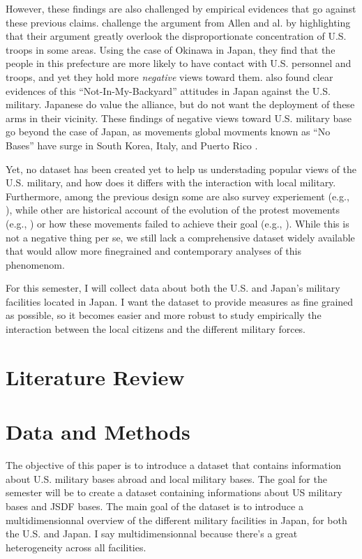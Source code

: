 \documentclass[12pt]{article}
\begin{document}
However, these findings are also challenged by empirical evidences
that go against these previous claims.  \textcite{hikotani_etal23}
challenge the argument from Allen and al. by highlighting that their
argument greatly overlook the disproportionate concentration of
U.S. troops in some areas.  Using the case of Okinawa in Japan,
they find that the people in this prefecture are more likely to
have contact with U.S.  personnel and troops, and yet they hold
more \textit{negative} views toward them. \textcite{horiuchi_tago23}
also found clear evidences of this ``Not-In-My-Backyard'' attitudes
in Japan against the U.S. military. Japanese do value the alliance,
but do not want the deployment of these arms in their vicinity.
These findings of negative views toward U.S. military base go beyond
the case of Japan, as movements global movments known as ``No Bases''
have surge in South Korea, Italy, and Puerto Rico \parencite{vine19}.

Yet, no dataset has been created yet to help us understading popular
views of the U.S. military, and how does it differs with the
interaction with local military. Furthermore, among the previous
design some are also survey experiement (e.g., \textcite{horiuchi_tago23}),
while other are historical account of the evolution of the protest
movements (e.g., \textcite{vine19}) or how these movements failed
to achieve their goal (e.g., \parencite{kim17a}). While this is not
a negative thing per se, we still lack a comprehensive dataset
widely available that would allow more finegrained and contemporary
analyses of this phenomenom.

For this semester, I will collect data about both the U.S. and Japan's 
military facilities located in Japan. I want the dataset to provide 
measures as fine grained as possible, so it becomes easier and more 
robust to study empirically the interaction between the local 
citizens and the different military forces. 

\section{Literature Review}


\section{Data and Methods}

The objective of this paper is to introduce a dataset that contains
information about U.S. military bases abroad and local military
bases. The goal for the semester will be to create a dataset
containing informations about US military bases and JSDF bases.
The main goal of the dataset is to introduce a multidimensionnal 
overview of the different military facilities in Japan, for both 
the U.S. and Japan. I say multidimensionnal because there's a great 
heterogeneity across all facilities. 
\end{document}
